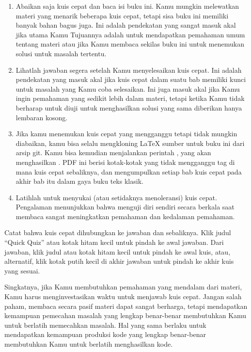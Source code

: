 {{\begin{enumerate}
\item	Abaikan saja kuis cepat dan baca isi buku ini.
	Kamu mungkin melewatkan materi yang menarik
	beberapa kuis cepat, tetapi sisa buku ini
	memiliki banyak bahan bagus juga.
	Ini adalah pendekatan yang sangat masuk akal jika utama Kamu
	Tujuannya adalah untuk mendapatkan pemahaman umum tentang materi
	atau jika Kamu membaca sekilas buku ini untuk menemukan
	solusi untuk masalah tertentu.
\item	Lihatlah jawaban segera setelah Kamu menyelesaikan kuis cepat.
	Ini adalah pendekatan yang masuk akal jika kuis cepat
	dalam suatu bab memiliki kunci untuk masalah yang Kamu
	coba selesaikan.
	Ini juga masuk akal jika Kamu ingin pemahaman yang sedikit lebih dalam
	materi, tetapi ketika Kamu tidak berharap untuk diuji untuk
	menghasilkan solusi yang sama diberikan hanya lembaran kosong.
\item   Jika kamu menemukan kuis cepat yang mengganggu tetapi tidak mungkin
	diabaikan, kamu bisa selalu mengkloning \LaTeX{} sumber untuk
	buku ini dari arsip git.
	Kamu bisa kemudian menjalankan perintah , yang akan
	menghasilkan .
	PDF ini berisi kotak-kotak yang tidak mengganggu tag di mana kuis cepat
	sebaliknya, dan mengumpulkan setiap bab kuis cepat
	pada akhir bab itu dalam gaya buku teks klasik.
\item	Latihlah untuk menyukai (atau setidaknya menoleransi) kuis cepat.
	Pengalaman menunjukkan bahwa menguji diri sendiri secara berkala
	saat membaca sangat meningkatkan pemahaman dan kedalaman
	pemahaman.
\end{enumerate}

Catat bahwa kuis cepat dihubungkan ke jawaban dan sebaliknya.
Klik judul ``Quick Quiz'' atau kotak hitam kecil
untuk pindah ke awal jawaban.
Dari jawaban, klik judul atau kotak hitam kecil untuk
pindah ke awal kuis, atau, alternatif, klik kotak putih kecil
di akhir jawaban untuk pindah ke akhir
kuis yang sesuai.
}\QuickQuizEndE
}

Singkatnya, jika Kamu membutuhkan pemahaman yang mendalam
dari materi, Kamu harus menginvestasikan waktu
untuk menjawab kuis cepat.
Jangan salah paham, membaca secara pasif materi dapat sangat
berharga, tetapi mendapatkan kemampuan pemecahan masalah yang lengkap benar-benar
membutuhkan Kamu untuk berlatih memecahkan masalah.
Hal yang sama berlaku untuk mendapatkan kemampuan produksi kode yang lengkap
benar-benar membutuhkan Kamu untuk berlatih menghasilkan kode.


